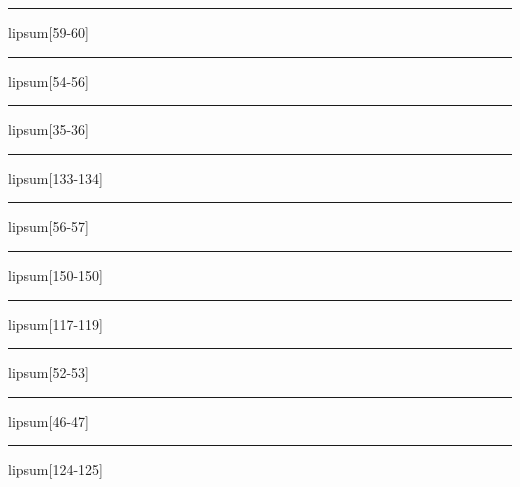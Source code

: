 \documentclass[11pt,a4paper]{article}
\begin{document}
\begin{simplewrap}
  \textcolor{teal!23}{\rule{3.5cm}{3.3cm}}
\end{simplewrap}
lipsum[59-60]

\begin{simplewrap}
  \textcolor{brown!56}{\rule{3.3cm}{7.4cm}}
\end{simplewrap}
lipsum[54-56]

\begin{simplewrap}
  \textcolor{olive!11}{\rule{3.7cm}{3.0cm}}
\end{simplewrap}
lipsum[35-36]

\begin{simplewrap}
  \textcolor{blue!46}{\rule{3.4cm}{3.3cm}}
\end{simplewrap}
lipsum[133-134]

\begin{simplewrap}
  \textcolor{red!56}{\rule{5.2cm}{8.6cm}}
\end{simplewrap}
lipsum[56-57]

\begin{simplewrap}
  \textcolor{red!40}{\rule{3.5cm}{8.6cm}}
\end{simplewrap}
lipsum[150-150]

\begin{simplewrap}
  \textcolor{cyan!49}{\rule{5.0cm}{4.1cm}}
\end{simplewrap}
lipsum[117-119]

\begin{simplewrap}
  \textcolor{green!24}{\rule{4.1cm}{3.1cm}}
\end{simplewrap}
lipsum[52-53]

\begin{simplewrap}
  \textcolor{cyan!53}{\rule{4.3cm}{3.2cm}}
\end{simplewrap}
lipsum[46-47]

\begin{simplewrap}
  \textcolor{blue!60}{\rule{4.6cm}{8.0cm}}
\end{simplewrap}
lipsum[124-125]
\end{document}
